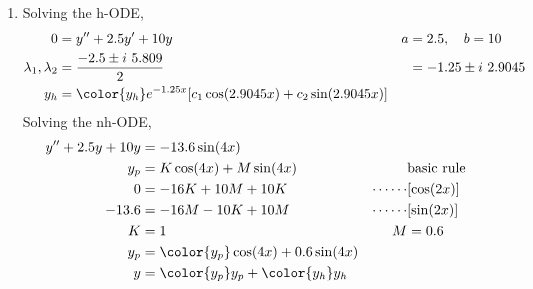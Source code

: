 \begin{enumerate}
    \item Solving the h-ODE,
          \begin{align}
              0                        & = y'' + 2.5y' + 10y            &
              a                        & = 2.5, \quad b = 10              \\
              \lambda_{1}, \lambda_{2} & = \frac{-2.5 \pm i\ 5.809}{2}  &
                                       & = -1.25 \pm i\ 2.9045            \\
              y_{h}                    & = \color{y_h} e^{-1.25x}[c_{1}
                      \cos(2.9045 x) + c_{2} \sin(2.9045 x)]
          \end{align}
          Solving the nh-ODE,
          \begin{align}
              y'' + 2.5y + 10y & = -13.6 \sin(4x)                              \\
              y_{p}            & = K \cos(4x) + M \sin(4x)                   &
                               & \text{basic rule}                             \\
              0                & = -16K + 10M + 10K                          &
              \cdots\cdots     & [\cos(2x)]                                    \\
              -13.6            & = -16M - 10K + 10M                          &
              \cdots\cdots     & [\sin(2x)]                                    \\
              K                & = 1                                         &
              M                & = 0.6                                         \\
              y_{p}            & = \color{y_p} \cos(4x) + 0.6 \sin(4x)         \\
              y                & = {\color{y_p} y_{p}} + {\color{y_h} y_{h}}
          \end{align}


\end{enumerate}
